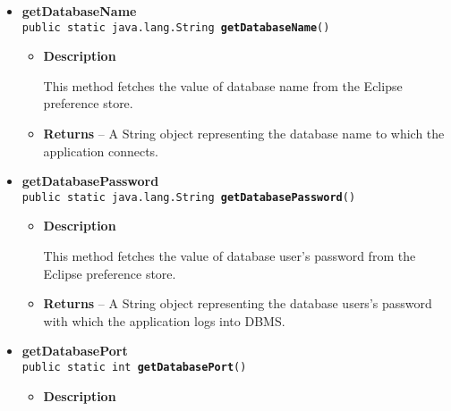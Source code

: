 {{{{{{{{{\begin{itemize}
{\begin{itemize}
{This method fetches the value of database host from the Eclipse preference store.
}
\item{{\bf  Returns} -- 
A String object representing the database host to which the application connects. 
}%
\end{itemize}
}%
\item{ 
\hypertarget{it.unisa.sesa.repominer.preferences.Preferences.getDatabaseName()}{{\bf  getDatabaseName}\\}
\texttt{public static java.lang.String\ {\bf  getDatabaseName}()
\label{it.unisa.sesa.repominer.preferences.Preferences.getDatabaseName()}}%
\begin{itemize}
\item{
{\bf  Description}

This method fetches the value of database name from the Eclipse preference store.
}
\item{{\bf  Returns} -- 
A String object representing the database name to which the application connects. 
}%
\end{itemize}
}%
\item{ 
\hypertarget{it.unisa.sesa.repominer.preferences.Preferences.getDatabasePassword()}{{\bf  getDatabasePassword}\\}
\texttt{public static java.lang.String\ {\bf  getDatabasePassword}()
\label{it.unisa.sesa.repominer.preferences.Preferences.getDatabasePassword()}}%
\begin{itemize}
\item{
{\bf  Description}

This method fetches the value of database user's password from the Eclipse preference store.
}
\item{{\bf  Returns} -- 
A String object representing the database users's password with which the application logs into DBMS. 
}%
\end{itemize}
}%
\item{ 
\hypertarget{it.unisa.sesa.repominer.preferences.Preferences.getDatabasePort()}{{\bf  getDatabasePort}\\}
\texttt{public static int\ {\bf  getDatabasePort}()
\label{it.unisa.sesa.repominer.preferences.Preferences.getDatabasePort()}}%
\begin{itemize}
\item{
{\bf  Description}

}
\end{itemize}}
\end{itemize}}}}}}}}}}
